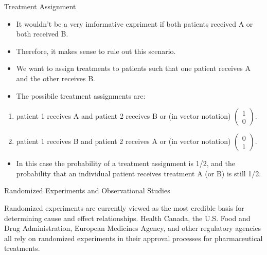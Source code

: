 \documentclass[10pt,ignorenonframetext,]{beamer}
\providecommand{\tightlist}{%
\setlength{\itemsep}{0pt}\setlength{\parskip}{0pt}}
\begin{document}
\begin{frame}{Treatment Assignment}

\begin{itemize}
\tightlist
\item
  It wouldn't be a very imformative expriment if both patients received
  A or both received B.\\
\item
  Therefore, it makes sense to rule out this scenario.\\
\item
  We want to assign treatments to patients such that one patient
  receives A and the other receives B.
\item
  The possibile treatment assignments are:
\end{itemize}

\begin{enumerate}
\def\labelenumi{\arabic{enumi}.}
\item
  patient 1 receives A and patient 2 receives B or (in vector notation)
  \(\begin{pmatrix}  1 \\  0  \end{pmatrix}.\)
\item
  patient 1 receives B and patient 2 receives A or (in vector notation)
  \(\begin{pmatrix}  0 \\  1\end{pmatrix}.\)
\end{enumerate}

\begin{itemize}
\tightlist
\item
  In this case the probability of a treatment assignment is 1/2, and the
  probability that an individual patient receives treatment A (or B) is
  still 1/2.
\end{itemize}

\end{frame}

\begin{frame}{Randomized Experiments and Observational Studies}

Randomized experiments are currently viewed as the most credible basis
for determining cause and effect relationships. Health Canada, the U.S.
Food and Drug Administration, European Medicines Agency, and other
regulatory agencies all rely on randomized experiments in their approval
processes for pharmaceutical treatments.

\end{frame}
\end{document}
